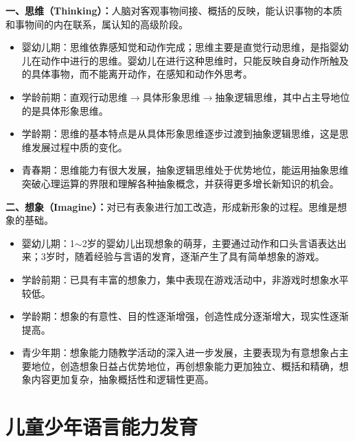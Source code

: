 \begin{keybox}
\textbf{一、思维（Thinking）：}人脑对客观事物间接、概括的反映，能认识事物的本质和事物间的内在联系，属认知的高级阶段。

\begin{itemize}[leftmargin=*]
    \item 婴幼儿期：思维依靠感知觉和动作完成；思维主要是直觉行动思维，是指婴幼儿在动作中进行的思维。婴幼儿在进行这种思维时，只能反映自身动作所触及的具体事物，而不能离开动作，在感知和动作外思考。
    \item 学龄前期：直观行动思维$\to$具体形象思维$\to$抽象逻辑思维，其中占主导地位的是具体形象思维。
    \item 学龄期：思维的基本特点是从具体形象思维逐步过渡到抽象逻辑思维，这是思维发展过程中质的变化。
    \item 青春期：思维能力有很大发展，抽象逻辑思维处于优势地位，能运用抽象思维突破心理运算的界限和理解各种抽象概念，并获得更多增长新知识的机会。
\end{itemize}

\textbf{二、想象（Imagine）：}对已有表象进行加工改造，形成新形象的过程。思维是想象的基础。

\begin{itemize}[leftmargin=*]
    \item 婴幼儿期：1$\sim$2岁的婴幼儿出现想象的萌芽，主要通过动作和口头言语表达出来；3岁时，随着经验与言语的发育，逐渐产生了具有简单想象的游戏。
    \item 学龄前期：已具有丰富的想象力，集中表现在游戏活动中，非游戏时想象水平较低。
    \item 学龄期：想象的有意性、目的性逐渐增强，创造性成分逐渐增大，现实性逐渐提高。
    \item 青少年期：想象能力随教学活动的深入进一步发展，主要表现为有意想象占主要地位，创造想象日益占优势地位，再创想象能力更加独立、概括和精确，想象内容更加复杂，抽象概括性和逻辑性更高。
\end{itemize}
\end{keybox}

\section{儿童少年语言能力发育}

